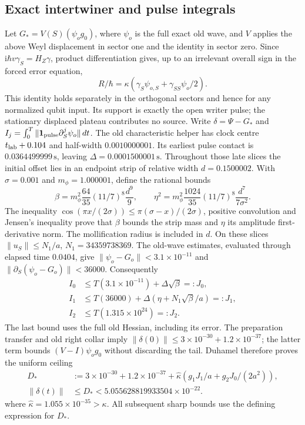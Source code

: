 \documentclass[11pt]{article}
\theoremstyle{definition}\newtheorem{definition}[theorem]{Definition}
\theoremstyle{remark}\newtheorem{remark}[theorem]{Remark}
\begin{document}
\subsection{Exact intertwiner and pulse integrals}
\label{prefix:intertwiner}
Let $G_*=V(S)(\psi_o g_0)$, where $\psi_o$ is the full exact old wave,
and $V$ applies the above Weyl displacement in sector one and the
identity in sector zero.  Since $\mathrm i\hbar v\gamma_S=H_Z\gamma$,
product differentiation gives, up to an irrelevant overall sign in the
forced error equation,
\[
 R/\hbar=\kappa(\gamma_S\psi_{o,S}+\gamma_{SS}\psi_o/2).
\]
This identity holds separately in the orthogonal sectors and hence for
any normalized qubit input.  Its support is exactly the open writer
pulse; the stationary displaced plateau contributes no source.
Write $\delta=\Psi-G_*$ and
$I_j=\int_0^T\|\mathbf1_{\rm pulse}\partial_S^j\psi_o\|\,dt$.
The old characteristic helper has clock centre $t_{\rm lab}+0.104$ and
half-width $0.0010000001$.  Its earliest pulse contact is
$0.0364499999\,\mathrm s$, leaving $\Delta=0.0001500001\,\mathrm s$.
Throughout those late slices the initial offset lies in an endpoint strip
of relative width $d=0.1500002$.  With $\sigma=0.001$ and
$m_\phi=1.000001$, define the rational bounds
\[
 \beta=m_\phi^2\frac{64}{35}(11/7)^8\frac{d^9}{9},\qquad
 \eta^2=m_\phi^2\frac{1024}{35}(11/7)^8
                         \frac{d^7}{7\sigma^2}.
\]
The inequality $\cos(\pi x/(2\sigma))\le
\pi(\sigma-x)/(2\sigma)$, positive convolution and Jensen's inequality
prove that $\beta$ bounds the strip mass and $\eta$ its amplitude
first-derivative norm.  The mollification radius is included in $d$.
On these slices $\|u_S\|\le N_1/a$, $N_1=34359738369$.
The old-wave estimates, evaluated through elapsed time $0.0404$,
give $\|\psi_o-G_o\|<3.1\times10^{-11}$ and
$\|\partial_S(\psi_o-G_o)\|<36000$.  Consequently
\begin{align}
 I_0&\le T(3.1\times10^{-11})+\Delta\sqrt\beta=:J_0,\nonumber\\
 I_1&\le T(36000)+\Delta(\eta+N_1\sqrt\beta/a)=:J_1,\nonumber\\
 I_2&\le T(1.315\times10^{24})=:J_2.
 \label{prefix:pulse}
\end{align}
The last bound uses the full old Hessian, including its error.
The preparation transfer and old right collar imply
$\|\delta(0)\|\le3\times10^{-30}+1.2\times10^{-37}$; the latter
term bounds $(V-I)\psi_og_0$ without discarding the tail.
Duhamel therefore proves the uniform ceiling
\begin{equation}
 \begin{aligned}
 D_*&:=3\times10^{-30}+1.2\times10^{-37}
  +\widehat\kappa(g_1J_1/a+g_2J_0/(2a^2)),\\
 \|\delta(t)\|&\le D_*<5.055628819933504\times10^{-22}.
 \end{aligned}
 \label{prefix:D}
\end{equation}
where $\widehat\kappa=1.055\times10^{-35}>\kappa$.
All subsequent sharp bounds use the defining expression for $D_*$.
\end{document}
